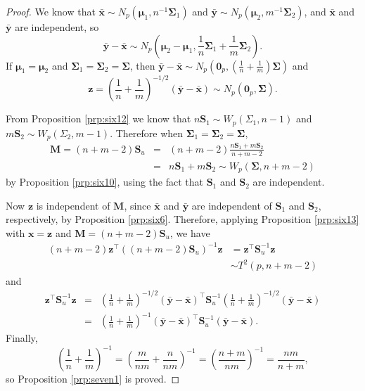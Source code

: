 \documentclass[
]{book}
\theoremstyle{definition}
\theoremstyle{definition}
\theoremstyle{definition}
\theoremstyle{definition}
\theoremstyle{remark}
\begin{document}
\begin{proof}
We know that \(\bar{\mathbf x} \sim N_p \left({\boldsymbol{\mu}}_1,n^{-1}\boldsymbol{\Sigma}_1 \right)\) and \(\bar{\mathbf y} \sim N_p \left({\boldsymbol{\mu}}_2,m^{-1}\boldsymbol{\Sigma}_2 \right)\), and \(\bar{\mathbf x}\) and \(\bar{\mathbf y}\) are independent, so
\[\bar{\mathbf y} - \bar{\mathbf x} \sim N_p \left({\boldsymbol{\mu}}_2 - {\boldsymbol{\mu}}_1, \frac{1}{n}\boldsymbol{\Sigma}_1 + \frac{1}{m} \boldsymbol{\Sigma}_2 \right).\]
If \({\boldsymbol{\mu}}_1 = {\boldsymbol{\mu}}_2\) and \(\boldsymbol{\Sigma}_1 = \boldsymbol{\Sigma}_2 = \boldsymbol{\Sigma}\), then \(\bar{\mathbf y} - \bar{\mathbf x} \sim N_p \left({\boldsymbol 0}_p, \left(\frac{1}{n} + \frac{1}{m} \right)\boldsymbol{\Sigma}\right)\) and
\[\mathbf z= \left(\frac{1}{n} + \frac{1}{m} \right)^{-1/2} (\bar{\mathbf y} - \bar{\mathbf x}) \sim N_p({\boldsymbol 0}_p,\boldsymbol{\Sigma}).\]

From Proposition \ref{prp:six12} we know that \(n\mathbf S_1 \sim W_p(\Sigma_1,n-1)\) and \(m\mathbf S_2 \sim W_p(\Sigma_2,m-1)\). Therefore when \(\boldsymbol{\Sigma}_1 = \boldsymbol{\Sigma}_2 = \boldsymbol{\Sigma}\),
\begin{eqnarray*}
\mathbf M= (n+m-2)\mathbf S_u &=& (n+m-2)\frac{n\mathbf S_1 + m\mathbf S_2}{n+m-2} \\
&=& n\mathbf S_1 + m\mathbf S_2 \sim W_p(\boldsymbol{\Sigma},n+m-2)
\end{eqnarray*}
by Proposition \ref{prp:six10}, using the fact that \(\mathbf S_1\) and \(\mathbf S_2\) are independent.

Now \(\mathbf z\) is independent of \(\mathbf M\), since \(\bar{\mathbf x}\) and \(\bar{\mathbf y}\) are independent of \(\mathbf S_1\) and \(\mathbf S_2\), respectively, by Proposition \ref{prp:six6}. Therefore, applying Proposition \ref{prp:six13} with \(\mathbf x= \mathbf z\) and \(\mathbf M= (n+m-2)\mathbf S_u\), we have
\begin{align*}
(n+m-2) \mathbf z^\top ((n+m-2)\mathbf S_u)^{-1} \mathbf z&= \mathbf z^\top \mathbf S_u^{-1} \mathbf z\\
&\sim T^2(p,n+m-2)
\end{align*}
and
\begin{eqnarray*}
\mathbf z^\top \mathbf S_u^{-1} \mathbf z&=& \left(\frac{1}{n} + \frac{1}{m} \right)^{-1/2} (\bar{\mathbf y} - \bar{\mathbf x})^\top \mathbf S_u^{-1} \left(\frac{1}{n} + \frac{1}{m} \right)^{-1/2} (\bar{\mathbf y} - \bar{\mathbf x}) \\
&=& \left(\frac{1}{n} + \frac{1}{m} \right)^{-1} (\bar{\mathbf y} - \bar{\mathbf x})^\top \mathbf S_u^{-1} (\bar{\mathbf y} - \bar{\mathbf x}).
\end{eqnarray*}
Finally,
\[\left(\frac{1}{n} + \frac{1}{m} \right)^{-1} = \left(\frac{m}{nm} + \frac{n}{nm} \right)^{-1} = \left(\frac{n+m}{nm} \right)^{-1} = \frac{nm}{n+m},\]
so Proposition \ref{prp:seven1} is proved.
\end{proof}
\end{document}
